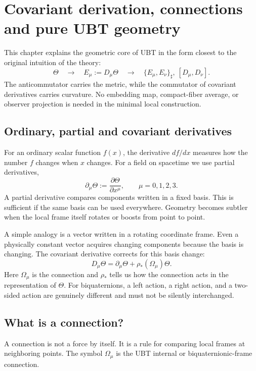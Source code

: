 
\chapter{Covariant derivation, connections and pure UBT geometry}
\label{ch:covariant-tetrad}

This chapter explains the geometric core of UBT in the form closest to the
original intuition of the theory:
\[
 \Theta\quad\longrightarrow\quad E_\mu:=D_\mu\Theta
 \quad\longrightarrow\quad
 \{E_\mu,E_\nu\}_\sharp,\ [D_\mu,D_\nu].
\]
The anticommutator carries the metric, while the commutator of covariant
derivatives carries curvature.  No embedding map, compact-fiber average, or
observer projection is needed in the minimal local construction.

\section{Ordinary, partial and covariant derivatives}
For an ordinary scalar function $f(x)$, the derivative $df/dx$ measures how the
number $f$ changes when $x$ changes.  For a field on spacetime we use partial
derivatives,
\[
 \partial_\mu\Theta:=\frac{\partial\Theta}{\partial x^\mu},
 \qquad \mu=0,1,2,3.
\]
A partial derivative compares components written in a fixed basis.  This is
sufficient if the same basis can be used everywhere.  Geometry becomes subtler
when the local frame itself rotates or boosts from point to point.

A simple analogy is a vector written in a rotating coordinate frame.  Even a
physically constant vector acquires changing components because the basis is
changing.  The covariant derivative corrects for this basis change:
\[
 D_\mu\Theta=\partial_\mu\Theta+\rho_*(\Omega_\mu)\Theta.
\]
Here $\Omega_\mu$ is the connection and $\rho_*$ tells us how the connection
acts in the representation of $\Theta$.  For biquaternions, a left action, a
right action, and a two-sided action are genuinely different and must not be
silently interchanged.

\section{What is a connection?}
A connection is not a force by itself.  It is a rule for comparing local frames
at neighboring points.  The symbol $\Omega_\mu$ is the UBT internal or
biquaternionic-frame connection.

